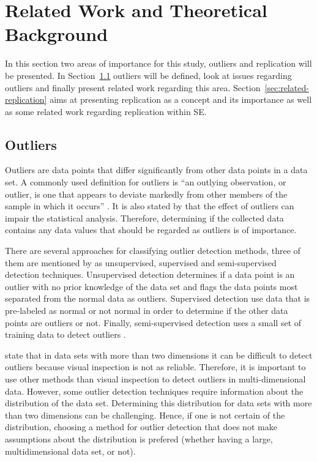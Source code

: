 ﻿\section{Related Work and Theoretical Background}
\label{sec:relatedwork}
In this section two areas of importance for this study, outliers and replication will be presented. In Section~\ref{sec:related-outliers} outliers will be defined, look at issues regarding outliers and finally present related work regarding this area. Section~\ref{sec:related-replication} aims at presenting replication as a concept and its importance as well as some related work regarding replication within SE\@.




\subsection{Outliers}
\label{sec:related-outliers}
Outliers are data points that differ significantly from other data points in a data set. A commonly used definition for outliers is ``an outlying observation, or outlier, is one that appears to deviate markedly from other members of the sample in which it occurs'' \citep{osborne2004power}. It is also stated by \citet{osborne2004power} that the effect of outliers can impair the statistical analysis. Therefore, determining if the collected data contains any data values that should be regarded as outliers is of importance. 




There are several approaches for classifying outlier detection methods, three of them are mentioned by \citet{hodge2004survey} as unsupervised, supervised and semi-supervised detection techniques. Unsupervised detection determines if a data point is an outlier with no prior knowledge of the data set and flags the data points most separated from the normal data as outliers. Supervised detection use data that is pre-labeled as normal or not normal in order to determine if the other data points are outliers or not. Finally, semi-supervised detection uses a small set of training data to detect outliers \citep{hodge2004survey}.  




\citet{rousseeuw1990unmasking} state that in data sets with more than two dimensions it can be difficult to detect outliers because visual inspection is not as reliable. Therefore, it is important to use other methods than visual inspection to detect outliers in multi-dimensional data. However, some outlier detection techniques require information about the distribution of the data set. Determining this distribution for data sets with more than two dimensions can be challenging. Hence, if one is not certain of the distribution, choosing a method for outlier detection that does not make assumptions about the distribution is prefered (whether having a large, multidimensional data set, or not).




